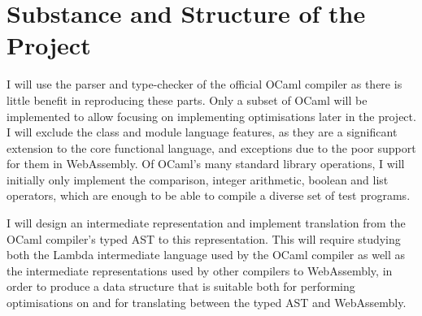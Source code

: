 \documentclass[12pt]{article}
\begin{document}
\section*{Substance and Structure of the Project}
I will use the parser and type-checker of the official OCaml compiler as there is little benefit in reproducing these parts. Only a subset of OCaml will be implemented to allow focusing on implementing optimisations later in the project. I will exclude the class and module language features, as they are a significant extension to the core functional language, and exceptions due to the poor support for them in WebAssembly. 
Of OCaml's many standard library operations, I will initially only implement the comparison, integer arithmetic, boolean and list operators, which are enough to be able to compile a diverse set of test programs.

I will design an intermediate representation and implement translation from the OCaml compiler's typed AST to this representation. This will require studying both the Lambda intermediate language used by the OCaml compiler as well as the intermediate representations used by other compilers to WebAssembly, in order to produce a data structure that is suitable both for performing optimisations on and for translating between the typed AST and WebAssembly.

\end{document}
